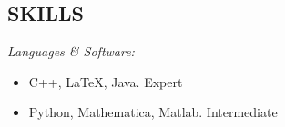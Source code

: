 \documentclass[margin, 10pt]{res} %
\begin{document}
\begin{resume}





\section{SKILLS} 

{\sl Languages \& Software:} 
\begin{itemize}
\item C++, \LaTeX, Java. \hfill Expert
\item Python, Mathematica, Matlab. \hfill Intermediate
\end{itemize}
 

\end{resume}
\end{document}
